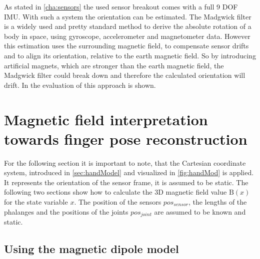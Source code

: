 As stated in \ref{cha:sensors} the used sensor breakout comes with a full 9 \ac{DOF} \ac{IMU}. With such a system the orientation can be estimated. The Madgwick filter \cite{madgwick2010efficient} is a widely used and pretty standard method to derive the absolute rotation of a body in space, using gyroscope, accelerometer and magnetometer data. However this estimation uses the surrounding magnetic field, to compensate sensor drifts and to align its orientation, relative to the earth magnetic field. So by introducing artificial magnets, which are stronger than the earth magnetic field, the Madgwick filter could break down and therefore the calculated orientation will drift. In  the evaluation of this approach is shown.




\section{Magnetic field interpretation towards finger pose reconstruction} \label{sec:magmodel}

For the following section it is important to note, that the Cartesian coordinate system, introduced in \ref{sec:handModel} and visualized in \ref{fig:handMod} is applied. It represents the orientation of the sensor frame, it is assumed to be static. The following two sections show how to calculate the 3D magnetic field value $ \mathrm{B}(x) $ for the state variable $ x $. The position of the sensors $ pos_{sensor} $, the lengths of the phalanges and the positions of the joints $ pos_{joint} $ are assumed to be known and static.

\subsection{Using the magnetic dipole model} \label{subsec:implDip}

